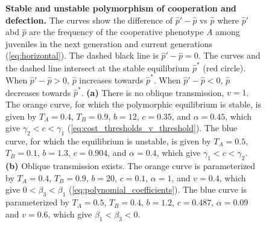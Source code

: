 \documentclass[12pt]{extarticle}
\begin{document}
\begin{figure}[p]
  \caption{\textbf{Stable and unstable polymorphism of cooperation and defection.}
  The curves show the difference of $\hat{p}'-\hat{p}$ vs $\hat{p}$ where $\hat{p}'$ abd $\hat{p}$ are the frequency of the cooperative phenotype $A$ among juveniles in the next generation and current generations (\autoref{eq:horizontal}).
  The dashed black line is $\hat{p}'-\hat{p}=0$.
  The curves and the dashed line intersect at the stable equilibrium $\hat{p}^*$ (red circle).
  When $\hat{p}' - \hat{p} > 0 $,  $\hat{p}$ increases towards $\hat{p}^*$.
  When $\hat{p}' - \hat{p} < 0$, $\hat{p}$ decreases towards $\hat{p}^*$.
  \textbf{(a)} There is no oblique transmission, $v=1$.
  The orange curve, for which the polymorphic equilibrium is stable, is given by $T_A = 0.4$, $T_B = 0.9$, $b = 12$, $c=0.35$, and $\alpha = 0.45$, which give $\gamma_2<c<\gamma_1$ (\autoref{eq:cost_thresholds_v_threshold}).
  The blue curve, for which the equilibrium is unstable, is given by $T_A = 0.5$, $T_B = 0.1$, $b = 1.3$, $c=0.904$, and $\alpha = 0.4$, which give $\gamma_1<c<\gamma_2$.
  \textbf{(b)} Oblique transmission exists. 
  The orange curve is parameterized by $T_A = 0.4$, $T_B = 0.9$, $b = 20$, $c=0.1$, $\alpha = 1$, and $v=0.4$, which give $0<\beta_3<\beta_1$ (\autoref{eq:polynomial_coefficients}).
  The blue curve is parameterized by $T_A = 0.5$, $T_B = 0.4$, $b=1.2$, $c=0.487$, $\alpha = 0.09$ and $v=0.6$, which give $\beta_1<\beta_3<0$.
  }
  \label{fig:polymorphism_recursive}
  \end{figure}
\end{document}
